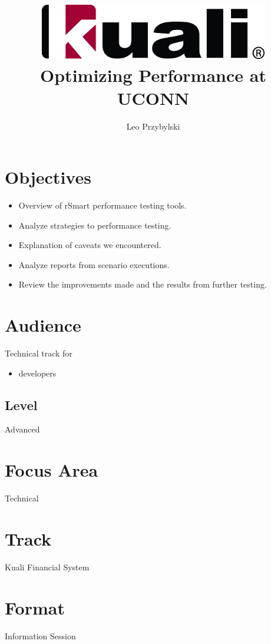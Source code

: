 \documentclass[12pt,notitlepage]{article}
\author{Leo Przybylski}
\title{\includegraphics[width=0.75\textwidth]{kuali_base.png}\\Optimizing
Performance at UCONN}
\date{}
\begin{document}
\maketitle
{}

\section{Objectives}
\begin{itemize}
\item Overview of rSmart performance testing tools.
\item Analyze strategies to performance testing.
\item Explanation of caveats we encountered.
\item Analyze reports from scenario executions.
\item Review the improvements made and the results from further testing.
\end{itemize}

\section{Audience}
Technical track for
\begin{itemize}
\item developers
\end{itemize}


\subsection{Level}
Advanced

\section{Focus Area}
Technical

\section{Track}
Kuali Financial System

\section{Format}
Information Session
\end{document}
